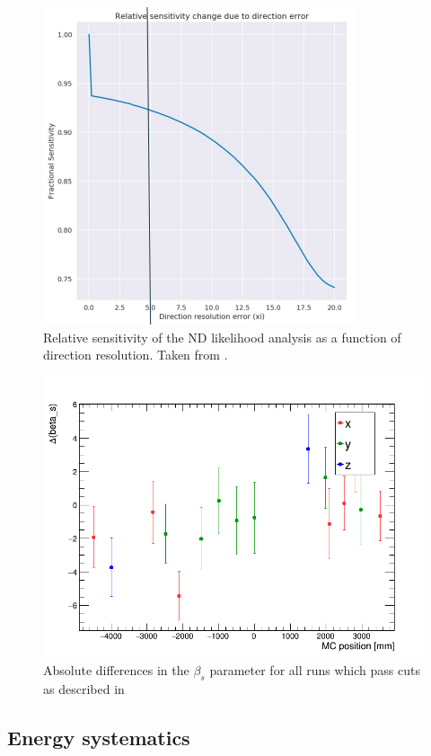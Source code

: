 \documentclass[]{article}
\begin{document}
\begin{figure}\centering
	\includegraphics[scale=0.8]{plots/Direction} 
	\caption{Relative sensitivity of the ND likelihood analysis as a function of direction resolution. Taken from \cite{MorganTalk}.}
	\label{fig:direction}
\end{figure}

\begin{figure}\centering
	\includegraphics[scale=0.5]{plots/beta_s_absolute} 
	\caption{Absolute differences in the $\beta_s$ parameter for all runs which pass cuts as described in \cite{WaterUniDoc}}
	\label{fig:beta_s_absolute}
\end{figure}

\subsection{Energy systematics}
\end{document}
